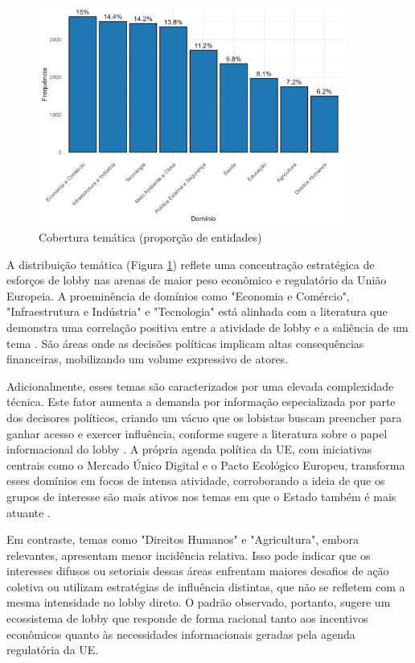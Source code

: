 \begin{figure}[!htbp]
\centering
\includegraphics[width=0.9\textwidth]{figures/descriptives_lobbyists/barplot_domain_distribution.png}
\caption{Cobertura temática (proporção de entidades)}
\label{fig:theme_coverage}
\end{figure}

A distribuição temática (Figura \ref{fig:theme_coverage}) reflete uma concentração estratégica de esforços de lobby nas arenas de maior peso econômico e regulatório da União Europeia. A proeminência de domínios como "Economia e Comércio", "Infraestrutura e Indústria" e "Tecnologia" está alinhada com a literatura que demonstra uma correlação positiva entre a atividade de lobby e a saliência de um tema \cite{caldeira2000lobbying, baumgartner2010agendas}. São áreas onde as decisões políticas implicam altas consequências financeiras, mobilizando um volume expressivo de atores.

Adicionalmente, esses temas são caracterizados por uma elevada complexidade técnica. Este fator aumenta a demanda por informação especializada por parte dos decisores políticos, criando um vácuo que os lobistas buscam preencher para ganhar acesso e exercer influência, conforme sugere a literatura sobre o papel informacional do lobby \cite{kluver_informational_2012}. A própria agenda política da UE, com iniciativas centrais como o Mercado Único Digital e o Pacto Ecológico Europeu, transforma esses domínios em focos de intensa atividade, corroborando a ideia de que os grupos de interesse são mais ativos nos temas em que o Estado também é mais atuante \cite{mahoney2008brussels}.

Em contraste, temas como "Direitos Humanos" e "Agricultura", embora relevantes, apresentam menor incidência relativa. Isso pode indicar que os interesses difusos ou setoriais dessas áreas enfrentam maiores desafios de ação coletiva ou utilizam estratégias de influência distintas, que não se refletem com a mesma intensidade no lobby direto. O padrão observado, portanto, sugere um ecossistema de lobby que responde de forma racional tanto aos incentivos econômicos quanto às necessidades informacionais geradas pela agenda regulatória da UE.

